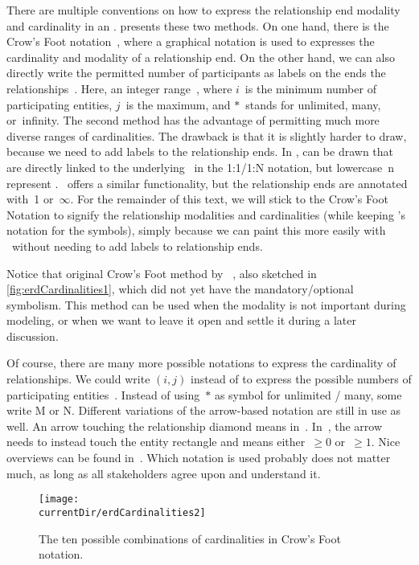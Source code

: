 There are multiple conventions on how to express the relationship end modality and cardinality in an .
 presents these two methods.
On one hand, there is the Crow's Foot notation~\cite{E1976BDSMEWACE,CM2000MDMAUDA,S2024D:CDMERDE}, where a graphical notation is used to expresses the cardinality and modality of a relationship end.
On the other hand, we can also directly write the permitted number of participants as labels on the ends the relationships~\cite{P2006CITRD:ERMI}.
Here, an integer range~, where $i$~is the minimum number of participating entities, $j$~is the maximum, and $*$~stands for unlimited, many, or~infinity.
The second method has the advantage of permitting much more diverse ranges of cardinalities.
The drawback is that it is slightly harder to draw, because we need to add labels to the relationship ends.
In \libreofficeBase,  can be drawn that are directly linked to the underlying \db\ in the 1:1/1:N notation, but lowercase~n represent .
\microsoftAccess\ offers a similar functionality, but the relationship ends are annotated with~1 or~$\infty$.
For the remainder of this text, we will stick to the Crow's Foot Notation to signify the relationship modalities and cardinalities (while keeping \citeauthor{C1976TERMTAUVOD}'s notation for the symbols), simply because we can paint this more easily with \yEd\ without needing to add labels to relationship ends.

Notice that original Crow's Foot method by \citeauthor{E1976BDSMEWACE}~\cite{E1976BDSMEWACE}, also sketched in \cref{fig:erdCardinalities1}, which did not yet have the mandatory/optional symbolism.
This method can be used when the modality is not important during modeling, or when we want to leave it open and settle it during a later discussion.

Of course, there are many more possible notations to express the cardinality of relationships.
We could write $(i,j)$ instead of  to express the possible numbers of participating entities~\cite{SS2005EIDDDFDB:CDDICAMP,G2011EW2ITDS:CMUTERM}.
Instead of using~$*$ as symbol for unlimited / many, some write M or N.
Different variations of the arrow-based notation are still in use as well.
An arrow touching the relationship diamond means  in~\cite{V1999C5DMS:CDUTERM}.
In~\cite{G2011EW2ITDS:CMUTERM}, the arrow needs to instead touch the entity rectangle and means either~$\geq0$ or~$\geq1$.
Nice overviews can be found in~\cite{B2025DS:AGTTERDE,S2012IITDM:AAAPGTERM}.
Which notation is used probably does not matter much, as long as all stakeholders agree upon and understand it.%
%
\begin{figure}%
\centering%
\texttt{[image: \\currentDir/erdCardinalities2]}%
\caption{The ten possible combinations of cardinalities in Crow's Foot notation.}%
\label{fig:erdCardinalities2}%
\end{figure}%

